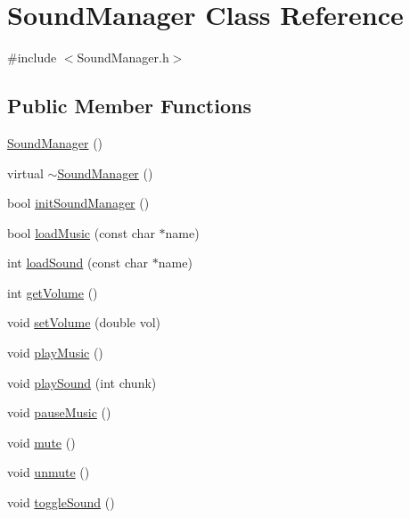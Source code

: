 \hypertarget{classSoundManager}{\section{Sound\-Manager Class Reference}
\label{classSoundManager}
}


{\ttfamily \#include $<$Sound\-Manager.\-h$>$}

\subsection*{Public Member Functions}
\begin{DoxyCompactItemize}
\item 
\hyperlink{classSoundManager_abcc1fbf3488be5788a42c9a4fe56df35}{Sound\-Manager} ()
\item 
virtual \hyperlink{classSoundManager_ad5dbf8eab22db48ff8f3db51b02f8938}{$\sim$\-Sound\-Manager} ()
\item 
bool \hyperlink{classSoundManager_ad1787c39537a0fc19215e7baacf04439}{init\-Sound\-Manager} ()
\item 
bool \hyperlink{classSoundManager_a57caed0509fdbe4710de7b5f7d4de201}{load\-Music} (const char $\ast$name)
\item 
int \hyperlink{classSoundManager_abaa5592584989a7c430b4c0bb74af36b}{load\-Sound} (const char $\ast$name)
\item 
int \hyperlink{classSoundManager_a013d883ce7fce00a50ffcc18b0336e16}{get\-Volume} ()
\item 
void \hyperlink{classSoundManager_a203b898b68db005daabc199622daf860}{set\-Volume} (double vol)
\item 
void \hyperlink{classSoundManager_a6265e3f73b56fea0cab813cd0447d310}{play\-Music} ()
\item 
void \hyperlink{classSoundManager_a77322f5a208b15ba5495c57103b302e5}{play\-Sound} (int chunk)
\item 
void \hyperlink{classSoundManager_a5071bf5e87394afdb1e4148227ffc3ea}{pause\-Music} ()
\item 
void \hyperlink{classSoundManager_ae8afa6738d1e3cb81ed90216574a08f4}{mute} ()
\item 
void \hyperlink{classSoundManager_adb6bd13299469546885f7469680a2699}{unmute} ()
\item 
void \hyperlink{classSoundManager_a316417bb0eb4ee5c84d7ed62cdd08705}{toggle\-Sound} ()
\end{DoxyCompactItemize}
